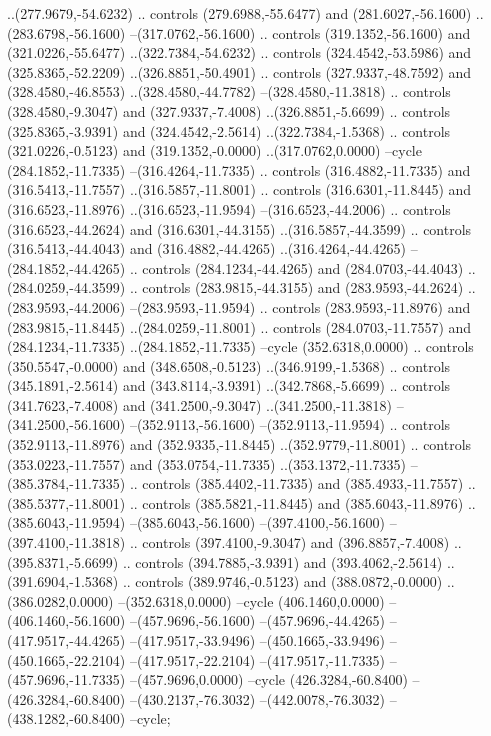 \begin{scope}[shift={(55,258)}]
..(277.9679,-54.6232) .. controls (279.6988,-55.6477) and (281.6027,-56.1600) ..(283.6798,-56.1600) --(317.0762,-56.1600) .. controls (319.1352,-56.1600) and (321.0226,-55.6477) ..(322.7384,-54.6232) .. controls (324.4542,-53.5986) and (325.8365,-52.2209) ..(326.8851,-50.4901) .. controls (327.9337,-48.7592) and (328.4580,-46.8553) ..(328.4580,-44.7782) --(328.4580,-11.3818) .. controls (328.4580,-9.3047) and (327.9337,-7.4008) ..(326.8851,-5.6699) .. controls (325.8365,-3.9391) and (324.4542,-2.5614) ..(322.7384,-1.5368) .. controls (321.0226,-0.5123) and (319.1352,-0.0000) ..(317.0762,0.0000) --cycle (284.1852,-11.7335) --(316.4264,-11.7335) .. controls (316.4882,-11.7335) and (316.5413,-11.7557) ..(316.5857,-11.8001) .. controls (316.6301,-11.8445) and (316.6523,-11.8976) ..(316.6523,-11.9594) --(316.6523,-44.2006) .. controls (316.6523,-44.2624) and (316.6301,-44.3155) ..(316.5857,-44.3599) .. controls (316.5413,-44.4043) and (316.4882,-44.4265) ..(316.4264,-44.4265) --(284.1852,-44.4265) .. controls (284.1234,-44.4265) and (284.0703,-44.4043) ..(284.0259,-44.3599) .. controls (283.9815,-44.3155) and (283.9593,-44.2624) ..(283.9593,-44.2006) --(283.9593,-11.9594) .. controls (283.9593,-11.8976) and (283.9815,-11.8445) ..(284.0259,-11.8001) .. controls (284.0703,-11.7557) and (284.1234,-11.7335) ..(284.1852,-11.7335) --cycle (352.6318,0.0000) .. controls (350.5547,-0.0000) and (348.6508,-0.5123) ..(346.9199,-1.5368) .. controls (345.1891,-2.5614) and (343.8114,-3.9391) ..(342.7868,-5.6699) .. controls (341.7623,-7.4008) and (341.2500,-9.3047) ..(341.2500,-11.3818) --(341.2500,-56.1600) --(352.9113,-56.1600) --(352.9113,-11.9594) .. controls (352.9113,-11.8976) and (352.9335,-11.8445) ..(352.9779,-11.8001) .. controls (353.0223,-11.7557) and (353.0754,-11.7335) ..(353.1372,-11.7335) --(385.3784,-11.7335) .. controls (385.4402,-11.7335) and (385.4933,-11.7557) ..(385.5377,-11.8001) .. controls (385.5821,-11.8445) and (385.6043,-11.8976) ..(385.6043,-11.9594) --(385.6043,-56.1600) --(397.4100,-56.1600) --(397.4100,-11.3818) .. controls (397.4100,-9.3047) and (396.8857,-7.4008) ..(395.8371,-5.6699) .. controls (394.7885,-3.9391) and (393.4062,-2.5614) ..(391.6904,-1.5368) .. controls (389.9746,-0.5123) and (388.0872,-0.0000) ..(386.0282,0.0000) --(352.6318,0.0000) --cycle (406.1460,0.0000) --(406.1460,-56.1600) --(457.9696,-56.1600) --(457.9696,-44.4265) --(417.9517,-44.4265) --(417.9517,-33.9496) --(450.1665,-33.9496) --(450.1665,-22.2104) --(417.9517,-22.2104) --(417.9517,-11.7335) --(457.9696,-11.7335) --(457.9696,0.0000) --cycle (426.3284,-60.8400) --(426.3284,-60.8400) --(430.2137,-76.3032) --(442.0078,-76.3032) --(438.1282,-60.8400) --cycle;

\end{scope}
